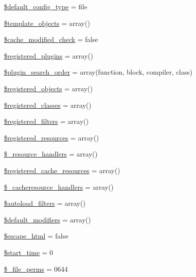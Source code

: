\begin{DoxyCompactItemize}
\item 
\hyperlink{class_smarty_a3617fe326b3d1e95e6b10ea35ecc6905}{\$default\+\_\+config\+\_\+type} = \textquotesingle{}file\textquotesingle{}
\item 
\hyperlink{class_smarty_a256e6c6abddc9a91dace09bbc9234a0b}{\$template\+\_\+objects} = array()
\item 
\hyperlink{class_smarty_a0734d0f7c5eea130baa18c0424ab07b0}{\$cache\+\_\+modified\+\_\+check} = false
\item 
\hyperlink{class_smarty_aa706d2dbce00ae10a1cf8fa49e53e903}{\$registered\+\_\+plugins} = array()
\item 
\hyperlink{class_smarty_ab943c28191f0e4f5d648d66aef9cf289}{\$plugin\+\_\+search\+\_\+order} = array(\textquotesingle{}function\textquotesingle{}, \textquotesingle{}block\textquotesingle{}, \textquotesingle{}compiler\textquotesingle{}, \textquotesingle{}class\textquotesingle{})
\item 
\hyperlink{class_smarty_a4aabbbb01d2968a5e108683bc4db09b2}{\$registered\+\_\+objects} = array()
\item 
\hyperlink{class_smarty_aa8f2a5bf79dcbe341a65e526ab20dee9}{\$registered\+\_\+classes} = array()
\item 
\hyperlink{class_smarty_a5fcb30291f6413ff9100e3f66f201764}{\$registered\+\_\+filters} = array()
\item 
\hyperlink{class_smarty_ab7db04d21656638787142239d7fe7118}{\$registered\+\_\+resources} = array()
\item 
\hyperlink{class_smarty_a8cb2cadafe33d876bcc5eab54aa8ccbf}{\$\+\_\+resource\+\_\+handlers} = array()
\item 
\hyperlink{class_smarty_a419a3cb24e76bf8b59991a0be944e87f}{\$registered\+\_\+cache\+\_\+resources} = array()
\item 
\hyperlink{class_smarty_aaa7b3fba7597adec16f41e315b5e50c9}{\$\+\_\+cacheresource\+\_\+handlers} = array()
\item 
\hyperlink{class_smarty_aca2078dde09728b223cdffe8209e6dcc}{\$autoload\+\_\+filters} = array()
\item 
\hyperlink{class_smarty_a48ec112144d4921e3a31fb1a5526ad2f}{\$default\+\_\+modifiers} = array()
\item 
\hyperlink{class_smarty_aba969aea1cf350a91f5eaf44b48daa56}{\$escape\+\_\+html} = false
\item 
\hyperlink{class_smarty_a73a034a7a0fbdd2c93f23fb6c9946ee9}{\$start\+\_\+time} = 0
\item 
\hyperlink{class_smarty_affa1e29315f40fe30ea516c7e8f2430e}{\$\+\_\+file\+\_\+perms} = 0644

\end{DoxyCompactItemize}
